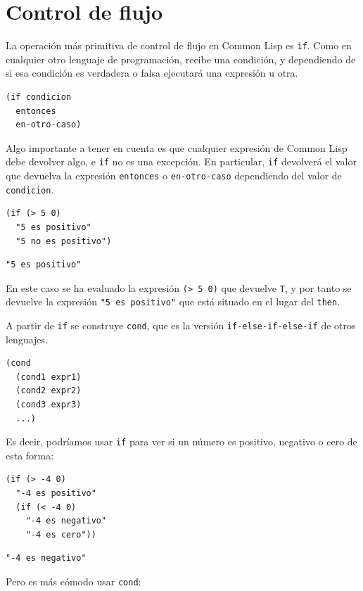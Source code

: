 \documentclass[11pt]{article}
\begin{document}
\section{Control de flujo}
\label{sec:org68587cc}

La operación más primitiva de control de flujo en Common Lisp es \texttt{if}. Como en cualquier otro lenguaje de programación, recibe una condición, y dependiendo de si esa condición es verdadera o falsa ejecutará una expresión u otra.

\begin{verbatim}
(if condicion 
  entonces 
  en-otro-caso)
\end{verbatim}

Algo importante a tener en cuenta es que cualquier expresión de Common Lisp debe devolver algo, e \texttt{if} no es una excepción. En particular, \texttt{if} devolverá el valor que devuelva la expresión \texttt{entonces} o \texttt{en-otro-caso} dependiendo del valor de \texttt{condicion}.

\begin{verbatim}
(if (> 5 0)
  "5 es positivo"
  "5 no es positivo")
\end{verbatim}

\begin{verbatim}
"5 es positivo"
\end{verbatim}


En este caso se ha evaluado la expresión \texttt{(> 5 0)} que devuelve \texttt{T}, y por tanto se devuelve la expresión \texttt{"5 es positivo"} que está situado en el lugar del \texttt{then}.

A partir de \texttt{if} se construye \texttt{cond}, que es la versión \texttt{if-else-if-else-if} de otros lenguajes. 

\begin{verbatim}
(cond
  (cond1 expr1)
  (cond2 expr2)
  (cond3 expr3)
  ...)
\end{verbatim}

Es decir, podríamos usar \texttt{if} para ver si un número es positivo, negativo o cero de esta forma:

\begin{verbatim}
(if (> -4 0)
  "-4 es positivo"
  (if (< -4 0)
    "-4 es negativo"
    "-4 es cero"))
\end{verbatim}

\begin{verbatim}
"-4 es negativo"
\end{verbatim}


Pero es más cómodo usar \texttt{cond}:
\end{document}
